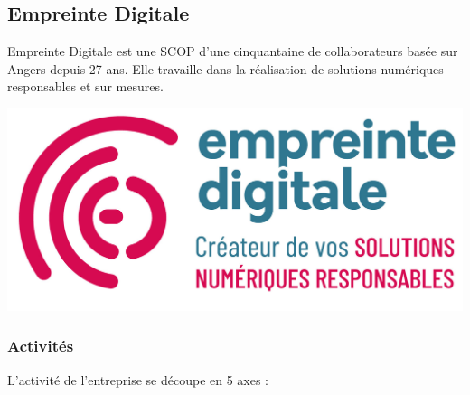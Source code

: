 \documentclass[12pt]{article}
\begin{document}
\subsection{Empreinte Digitale}
\noindent%
\begin{minipage}{.7\textwidth}%
Empreinte Digitale est une \gls{SCOP} d'une cinquantaine de collaborateurs basée sur Angers depuis 27 ans. 
Elle travaille dans la réalisation de solutions numériques responsables et sur mesures.
\end{minipage}%
\hfill
\begin{minipage}{.3\textwidth}%
\begin{center}
    \includegraphics[scale=0.3]{src/ed_logo.png}
\end{center}
\end{minipage}%

\subsubsection{Activités}
L'activité de l'entreprise se découpe en 5 axes :
\end{document}
